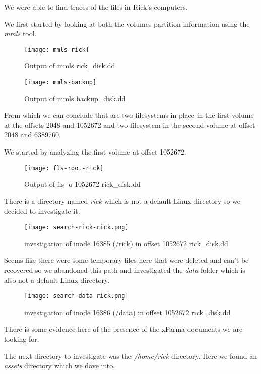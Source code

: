 We were able to find traces of the files in Rick's computers.

We first started by looking at both the volumes partition information using the \textit{mmls} tool.

\begin{figure}[H]
    \texttt{[image: mmls-rick]}
    \centering
    \caption{Output of mmls rick\_disk.dd}
\end{figure}

\begin{figure}[H]
    \texttt{[image: mmls-backup]}
    \centering
    \caption{Output of mmls backup\_disk.dd}
\end{figure}

From which we can conclude that are two filesystems in place in the first volume at the offsets 2048 and 1052672 and two filesystem in the second volume at offset 2048 and 6389760.

We started by analyzing the first volume at offset 1052672.

\begin{figure}[H]
    \texttt{[image: fls-root-rick]}
    \centering
    \caption{Output of fls -o 1052672 rick\_disk.dd}
\end{figure}

There is a directory named \textit{rick} which is not a default Linux directory so we decided to investigate it.

\begin{figure}[H]
    \texttt{[image: search-rick-rick.png]}
    \centering
    \caption{investigation of inode 16385 (/rick) in offset 1052672 rick\_disk.dd}
\end{figure}

Seems like there were some temporary files here that were deleted and can't be recovered so we abandoned this path and investigated the \textit{data} folder which is also not a default Linux directory.

\begin{figure}[H]
    \texttt{[image: search-data-rick.png]}
    \centering
    \caption{investigation of inode 16386 (/data) in offset 1052672 rick\_disk.dd}
\end{figure}

There is some evidence here of the presence of the xFarma documents we are looking for.

The next directory to investigate was the \textit{/home/rick} directory. Here we found an \textit{assets} directory which we dove into.

